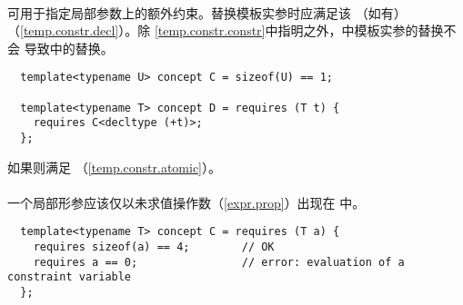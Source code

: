 
\paragraph{} %
可用于指定局部参数上的额外约束。替换模板实参时应满足该
（如有）（\ref{temp.constr.decl}）。除
\ref{temp.constr.constr}中指明之外，中模板实参的替换不会
导致中的替换。

\begin{example}
  \begin{lstlisting}
  template<typename U> concept C = sizeof(U) == 1;

  template<typename T> concept D = requires (T t) {
    requires C<decltype (+t)>;
  };
  \end{lstlisting}
  如果则满足
  （\ref{temp.constr.atomic}）。
\end{example}

\paragraph{} %
一个局部形参应该仅以未求值操作数（\ref{expr.prop}）出现在
中。

\begin{example}
  \begin{lstlisting}
  template<typename T> concept C = requires (T a) {
    requires sizeof(a) == 4;        // OK
    requires a == 0;                // error: evaluation of a constraint variable
  };
  \end{lstlisting}
\end{example}
